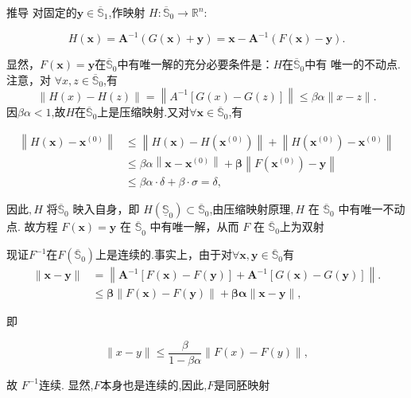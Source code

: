 \documentclass{lzureport}
\begin{document}
\begin{derivation}{推导}
对固定的$\boldsymbol{y}\in \overline {\mathbb{S} }_1$,作映射 $H:\overline{\mathbb{S}}_0\to\mathbb{R}^n:$

$$H(\boldsymbol{x})=\boldsymbol{A}^{-1}(G(\boldsymbol{x})+\boldsymbol{y})=\boldsymbol{x}-\boldsymbol{A}^{-1}(F(\boldsymbol{x})-\boldsymbol{y}).$$

显然，$F(\boldsymbol{x})=\boldsymbol{y}$在$\overline{\mathbb{S}}_0$中有唯一解的充分必要条件是：$H$在$\overline{\mathbb{S}}_0$中有
唯一的不动点. 注意，对 $\forall x,z\in\overline{\mathbb{S}}_0$,有
$$\|H(x)-H(z)\|=\left\|A^{-1}[G(x)-G(z)]\right\|\leqslant\beta\alpha\|x-z\|.$$
因$\beta\alpha<1$,故$H$在$\overline{\mathbb{S}}_0$上是压缩映射.又对$\forall\boldsymbol{x}\in\overline{\mathbb{S}}_0$,有

$$\begin{aligned}
\left\|H(\boldsymbol{x})-\boldsymbol{x}^{(0)}\right\|&\leqslant\left\|H(\boldsymbol{x})-H\left(\boldsymbol{x}^{(0)}\right)\right\|+\left\|H\left(\boldsymbol{x}^{(0)}\right)-\boldsymbol{x}^{(0)}\right\|\\&\leqslant\beta\alpha\left\|\boldsymbol{x}-\boldsymbol{x}^{(0)}\right\|+\boldsymbol{\beta}\left\|F\left(\boldsymbol{x}^{(0)}\right)-\boldsymbol{y}\right\|\\&\leqslant\beta\alpha\cdot\delta+\beta\cdot\sigma=\delta,\end{aligned}$$

因此$,H$ 将$\overline{\mathbb{S}}_0$ 映入自身，即 $H\left(\underline{\mathbb{S}}_0\right)\subset\overline{\mathbb{S}}_0$,由压缩映射原理$,H$ 在 $\overline{\mathbb{S}}_0$ 中有唯一不动点. 故方程 $F(\boldsymbol{x})=\boldsymbol{y\text{ 在 }\overline{\mathbb{S}}}_0$ 中有唯一解，从而 $F$ 在 $\overline{\mathbb{S}}_0$上为双射

现证$F^{-1}$在$F\left(\overline{\mathbb{S}}_0\right)$上是连续的.事实上，由于对$\forall\boldsymbol x,\boldsymbol y\in\overline{\mathbb{S}}_0$有
$$\begin{aligned}\|\boldsymbol{x}-\boldsymbol{y}\|&=\left\|\boldsymbol{A}^{-1}[F(\boldsymbol{x})-F(\boldsymbol{y})]+\boldsymbol{A}^{-1}[G(\boldsymbol{x})-G(\boldsymbol{y})]\right\|.\\&\leqslant\boldsymbol{\beta}\|F(\boldsymbol{x})-F(\boldsymbol{y})\|+\boldsymbol{\beta}\boldsymbol{\alpha}\|\boldsymbol{x}-\boldsymbol{y}\|,\end{aligned}$$

即

$$\|x-y\|\leqslant\frac\beta{1-\beta\alpha}\|F(x)-F(y)\|,$$

故 $F^{-1}$连续. 显然,$F$本身也是连续的,因此,$F$是同胚映射

\end{derivation}
\end{document}

